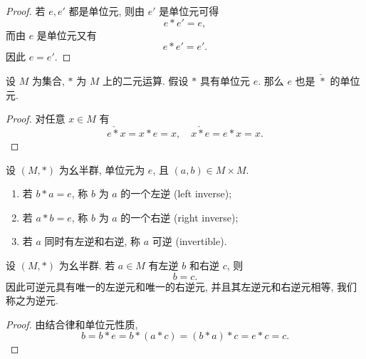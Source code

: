 \documentclass[usesamecnt, thmcnt=section, lang=cn, newtx, 10pt, scheme=chinese]{elegantbook}
\begin{document}
\begin{proof}
若 $e,e'$ 都是单位元, 则由 $e'$ 是单位元可得
\[
 e*e'=e,
\]
而由 $e$ 是单位元又有
\[
 e*e'=e'.
\]
因此 $e=e'$.
\end{proof}

\begin{proposition}\label{Pro: opposite identity}
设 $M$ 为集合, $*$ 为 $M$ 上的二元运算. 假设 $*$ 具有单位元 $e$. 那么 $e$ 也是 $\check{*}$ 的单位元.
\end{proposition}
\begin{proof}
对任意 $x\in M$ 有 
\[e\mathbin{\check{*}}x=x*e=x,\quad x
\mathbin{\check{*}}e=e*x=x.\]
\end{proof}

\begin{definition}[左逆、右逆与可逆元]\label{def:alg-inverse}
设 $(M,*)$ 为幺半群, 单位元为 $e$, 且 $(a,b)\in M\times M$.
\begin{enumerate}[label=\rm(\arabic*)]
  \item 若 $b*a=e$, 称 $b$ 为 $a$ 的一个{\color{blue}左逆 (left inverse)};
  \item 若 $a*b=e$, 称 $b$ 为 $a$ 的一个{\color{blue}右逆 (right inverse)};
  \item 若 $a$ 同时有左逆和右逆, 称 $a$ {\color{blue}可逆 (invertible)}.
\end{enumerate}
\end{definition}

\begin{proposition}\label{prop:alg-left-right-inverse}
设 $(M,*)$ 为幺半群. 若 $a\in M$ 有左逆 $b$ 和右逆 $c$, 则
\[
 b=c.
\]
因此可逆元具有唯一的左逆元和唯一的右逆元, 并且其左逆元和右逆元相等, 我们称之为{\color{blue}逆元}.
\end{proposition}

\begin{proof}
由结合律和单位元性质,
\[
 b=b*e=b*(a*c)=(b*a)*c=e*c=c.
\]
\end{proof}
\end{document}
